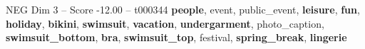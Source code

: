 \begin{textsample}{NEG Dim 3 – Score -12.00 – t000344}  \label{ex:f3_neg_029}
\textbf{people}, event, public\_event, \textbf{leisure}, \textbf{fun}, \textbf{holiday}, \textbf{bikini}, \textbf{swimsuit}, \textbf{vacation}, \textbf{undergarment}, photo\_caption, \textbf{swimsuit\_bottom}, \textbf{bra}, \textbf{swimsuit\_top}, festival, \textbf{spring\_break}, \textbf{lingerie}

\end{textsample}

